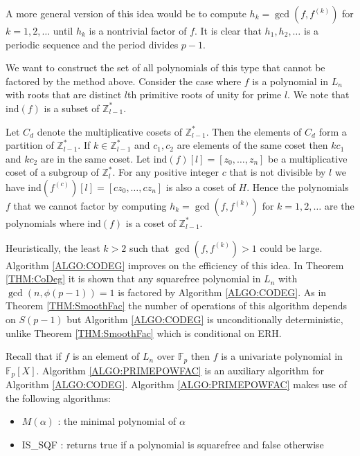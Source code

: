 \documentclass{article}
\theoremstyle{plain}
\theoremstyle{definition}
\def\Fp {{ \mathbb{F} _ {p} }}
\def\ind {{ \mathrm{ind} }}
\begin{document}
		A more general version of this idea would be to compute $h_k=\gcd(f,f^{(k)})$ for $k=1,2,\ldots$ until $h_k$ is a nontrivial factor of $f$. It is clear that $h_1,h_2,\ldots$ is a periodic sequence and the period divides $p-1$. 
		
		We want to construct the set of all polynomials of this type that cannot be factored by the method above. Consider the case where $f$ is a polynomial in $L_n$ with roots that are distinct $l$th primitive roots of unity for prime $l$. We note that $\ind(f)$ is a subset of $\mathbb{Z}^{*}_{l-1}$. 
		
		Let $C_d$ denote the multiplicative cosets of $\mathbb{Z}^{*}_{l-1}$. Then the elements of $C_d$ form a partition of $\mathbb{Z}^{*}_{l-1}$. If $k \in \mathbb{Z}^{*}_{l-1}$ and $c_1,c_2$ are elements of the same coset then $kc_1$ and $kc_2$ are in the same coset. Let $\ind(f)[l]=[z_0,\ldots,z_n]$ be a multiplicative coset of a subgroup of $\mathbb{Z}^{*}_l$. For any positive integer $c$ that is not divisible by $l$ we have $\ind(f^{(c)})[l]=[cz_0,\ldots,cz_n]$ is also a coset of $H$. Hence the polynomials $f$ that we cannot factor by computing $h_k=\gcd(f,f^{(k)})$ for $k=1,2,\ldots$ are the polynomials where $\ind(f)$ is a coset of $\mathbb{Z}^{*}_{l-1}$.
			
		Heuristically, the least $k>2$ such that $\gcd(f,f^{(k)})>1$ could be large. Algorithm \ref{ALGO:CODEG} improves on the efficiency of this idea. In Theorem \ref{THM:CoDeg} it is shown that any squarefree polynomial in $L_n$ with $\gcd(n,\phi(p-1))=1$ is factored by Algorithm \ref{ALGO:CODEG}. As in Theorem \ref{THM:SmoothFac} the number of operations of this algorithm depends on $S(p-1)$ but Algorithm \ref{ALGO:CODEG} is unconditionally deterministic, unlike Theorem \ref{THM:SmoothFac} which is conditional on ERH.
		
		Recall that if $f$ is an element of $L_n$ over $\Fp$ then $f$ is a univariate polynomial in $\Fp[X]$. Algorithm \ref{ALGO:PRIMEPOWFAC} is an auxiliary algorithm for Algorithm \ref{ALGO:CODEG}. Algorithm \ref{ALGO:PRIMEPOWFAC} makes use of the following algorithms: 
		\begin{itemize}
		    \item $M(\alpha)$ : the minimal polynomial of $\alpha$ 
		    \item IS\_SQF : returns true if a polynomial is squarefree and false otherwise 
		\end{itemize}
		
\end{document}
